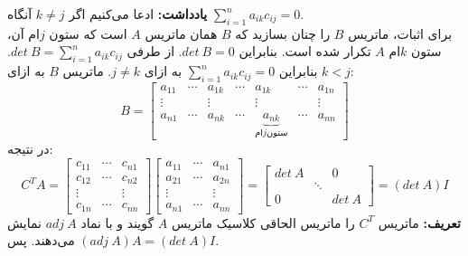 \textbf{یادداشت:} ادعا می‌کنیم اگر $k\neq j$ آنگاه $\sum_{i=1}^n a_{ik}c_{ij} = 0$.\\
برای اثبات، ماتریس $B$ را چنان بسازید که $B$
همان ماتریس $A$ است که ستون $j$ام آن، ستون $k$ام $A$ تکرار شده است. بنابراین $det\:B = 0$. از طرفی $det\:B = \sum_{i=1}^n a_{ik}c_{ij}$. بنابراین $\sum_{i=1}^n a_{ik}c_{ij} = 0$ به ازای $j\neq k$. ماتریس $B$ به ازای $k<j$:
$$B = \begin{bmatrix}
a_{11}&\cdots&a_{1k}&\cdots & a_{1k} & \cdots &a_{1n}\\
\vdots && \vdots &&\vdots && \vdots\\
a_{n1} & \cdots & a_{nk} & \cdots & \underbrace{a_{nk}}_{\text{ام}j\text{ستون}} & \cdots & a_{nn}
\end{bmatrix}$$
در نتیجه:
$$C^TA = \begin{bmatrix}
c_{11}&\cdots&c_{n1}\\
c_{12}& \cdots & c_{n2}\\
\vdots && \vdots\\
c_{1n}& \cdots & c_{nn}
\end{bmatrix}\begin{bmatrix}
a_{11}&\cdots&a_{n1}\\
a_{21}& \cdots & a_{2n}\\
\vdots && \vdots\\
a_{n1}& \cdots & a_{nn}
\end{bmatrix} = \begin{bmatrix}
det\: A && 0 \\
& \ddots &\\
0 && det\: A
\end{bmatrix} = (det\:A )I  $$
\textbf{تعریف:} ماتریس $C^T$ را ماتریس الحاقی کلاسیک ماتریس $A$ گویند و با نماد $adj\: A$ نمایش می‌دهند. پس $(adj\: A)A = (det\:A)I$.

